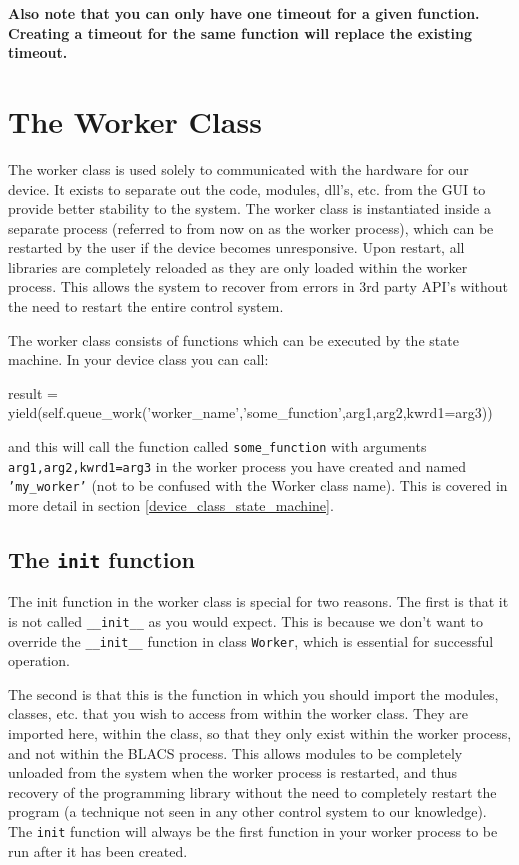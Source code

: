 \documentclass[12pt]{article}
\begin{document}
\textbf{Also note that you can only have one timeout for a given function. Creating a timeout for the same function will replace the existing timeout.}



\newpage
\section{The Worker Class}
The worker class is used solely to communicated with the hardware for our device. 
It exists to separate out the code, modules, dll's, etc. from the GUI to provide better stability to the system. 
The worker class is instantiated inside a separate process (referred to from now on as the worker process), which can be restarted by the user if the device becomes unresponsive.
Upon restart, all libraries are completely reloaded as they are only loaded within the worker process. 
This allows the system to recover from errors in 3rd party API's without the need to restart the entire control system.

The worker class consists of functions which can be executed by the state machine. 
In your device class you can call:
\begin{python}
result = yield(self.queue_work('worker_name','some_function',arg1,arg2,kwrd1=arg3))
\end{python}
and this will call the function called \texttt{some\_function} with arguments \texttt{arg1,arg2,kwrd1=arg3} in the worker process you have created and named \texttt{'my\_worker'} (not to be confused with the Worker class name). 
This is covered in more detail in section \ref{device_class_state_machine}.

\subsection{The \texttt{init} function}
The init function in the worker class is special for two reasons. 
The first is that it is not called \texttt{\_\_init\_\_} as you would expect. 
This is because we don't want to override the \texttt{\_\_init\_\_} function in class \texttt{Worker},  which is essential for successful operation.

The second is that this is the function in which you should import the modules, classes, etc. that you wish to access from within the worker class. 
They are imported here, within the class, so that they only exist within the worker process, and not within the BLACS process. 
This allows modules to be completely unloaded from the system when the worker process is restarted, and thus recovery of the programming library without the need to completely restart the program (a technique not seen in any other control system to our knowledge).
The \texttt{{init}} function will always be the first function in your worker process to be run after it has been created.
\end{document}
